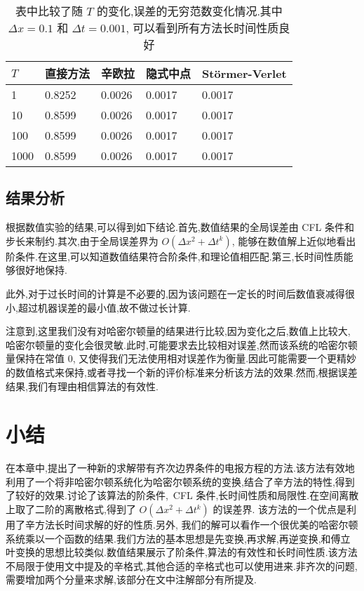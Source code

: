 \begin{table}[h]
  \centering
\caption{表中比较了随 $T$ 的变化,误差的无穷范数变化情况.其中 $\Delta x=0.1$ 和 $\Delta t=0.001$, 可以看到所有方法长时间性质良好}
\begin{tabularx}{\linewidth}{XXXXX}
 \toprule[1.5pt]
 $T$ &直接方法 & 辛欧拉 & 隐式中点 & St\"{o}rmer-Verlet\\
 \midrule[1pt]
 1 & 0.8252 & 0.0026 & 0.0017 & 0.0017 \\
 10 & 0.8599 & 0.0026 & 0.0017 & 0.0017 \\
 100 & 0.8599 & 0.0026 & 0.0017 & 0.0017 \\
 1000 & 0.8599 & 0.0026 & 0.0017 & 0.0017 \\
 \bottomrule[1.5pt]
\end{tabularx}
  \label{tab:t3}
\end{table}

\subsection{结果分析}

根据数值实验的结果,可以得到如下结论.首先,数值结果的全局误差由 CFL 条件和步长来制约.其次,由于全局误差界为 $O(\Delta x^2+ \Delta t^k)$, 能够在数值解上近似地看出阶条件.在这里,可以知道数值结果符合阶条件,和理论值相匹配.第三,长时间性质能够很好地保持.

此外,对于过长时间的计算是不必要的,因为该问题在一定长的时间后数值衰减得很小,超过机器误差的最小值,故不做过长计算.

\begin{remark}
{\rm 注意到,这里我们没有对哈密尔顿量的结果进行比较,因为变化之后,数值上比较大,哈密尔顿量的变化会很灵敏.此时,可能要求去比较相对误差,然而该系统的哈密尔顿量保持在常值 $0$, 又使得我们无法使用相对误差作为衡量.因此可能需要一个更精妙的数值格式来保持,或者寻找一个新的评价标准来分析该方法的效果.然而,根据误差结果,我们有理由相信算法的有效性.}
\end{remark}

\section{小结}\label{sec:02conclusion}
在本章中,提出了一种新的求解带有齐次边界条件的电报方程的方法.该方法有效地利用了一个将非哈密尔顿系统化为哈密尔顿系统的变换,结合了辛方法的特性,得到了较好的效果.讨论了该算法的阶条件,~CFL 条件,长时间性质和局限性.在空间离散上取了二阶的离散格式,得到了 $O(\Delta x^2+ \Delta
t^k)$ 的误差界. 该方法的一个优点是利用了辛方法长时间求解的好的性质.另外, 我们的解可以看作一个很优美的哈密尔顿系统乘以一个函数的结果.我们方法的基本思想是先变换,再求解,再逆变换,和傅立叶变换的思想比较类似.数值结果展示了阶条件,算法的有效性和长时间性质.该方法不局限于使用文中提及的辛格式,其他合适的辛格式也可以使用进来.非齐次的问题,需要增加两个分量来求解,该部分在文中注解部分有所提及.
